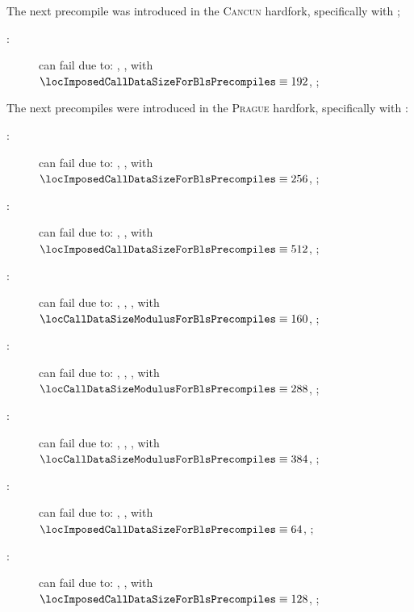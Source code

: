 The next precompile was introduced in the \textsc{Cancun} hardfork, specifically with \cite{EIP-4788};
\begin{description}
	\item[:]
		can fail due to:
		\locBlsPrecompileFailureReasonGas,
		\locBlsPrecompileFailureReasonSize, with $\locImposedCallDataSizeForBlsPrecompiles \equiv 192$,
		\locBlsPrecompileFailureReasonData;
\end{description}
The next precompiles were introduced in the \textsc{Prague} hardfork, specifically with \cite{EIP-2537}:
\begin{description}
	\item[:]
		can fail due to:
		\locBlsPrecompileFailureReasonGas,
		\locBlsPrecompileFailureReasonSize, with $\locImposedCallDataSizeForBlsPrecompiles \equiv 256$,
		\locBlsPrecompileFailureReasonData;
	\item[:]
		can fail due to:
		\locBlsPrecompileFailureReasonGas,
		\locBlsPrecompileFailureReasonSize, with $\locImposedCallDataSizeForBlsPrecompiles \equiv 512$,
		\locBlsPrecompileFailureReasonData;
	\item[:]
		can fail due to:
		\locBlsPrecompileFailureReasonGas,
		\locBlsPrecompileFailureReasonEmpty,
		\locBlsPrecompileFailureReasonMod, with $\locCallDataSizeModulusForBlsPrecompiles \equiv 160$,
		\locBlsPrecompileFailureReasonData;
	\item[:]
		can fail due to:
		\locBlsPrecompileFailureReasonGas,
		\locBlsPrecompileFailureReasonEmpty,
		\locBlsPrecompileFailureReasonMod, with $\locCallDataSizeModulusForBlsPrecompiles \equiv 288$,
		\locBlsPrecompileFailureReasonData;
	\item[:]
		can fail due to:
		\locBlsPrecompileFailureReasonGas,
		\locBlsPrecompileFailureReasonEmpty,
		\locBlsPrecompileFailureReasonMod, with $\locCallDataSizeModulusForBlsPrecompiles \equiv 384$,
		\locBlsPrecompileFailureReasonData;
	\item[:]
		can fail due to:
		\locBlsPrecompileFailureReasonGas,
		\locBlsPrecompileFailureReasonSize, with $\locImposedCallDataSizeForBlsPrecompiles \equiv 64$,
		\locBlsPrecompileFailureReasonData;
	\item[:]
		can fail due to:
		\locBlsPrecompileFailureReasonGas,
		\locBlsPrecompileFailureReasonSize, with $\locImposedCallDataSizeForBlsPrecompiles \equiv 128$,
		\locBlsPrecompileFailureReasonData;
\end{description}
